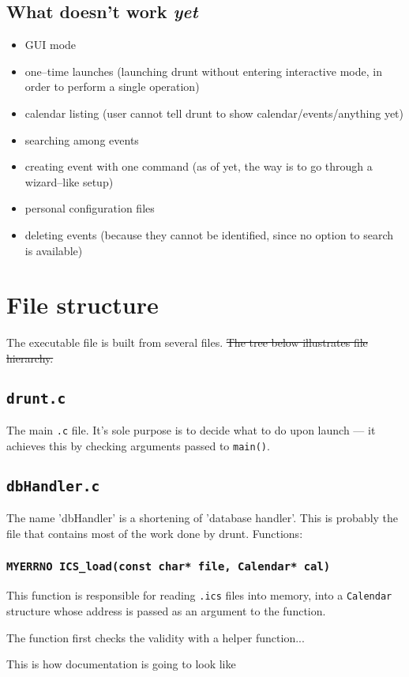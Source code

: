 \documentclass[a4paper]{article}
\begin{document}
\subsection{What doesn't work \textit{yet}}
\begin{itemize}
	\item GUI mode
	\item one--time launches (launching drunt without entering interactive mode, in order to perform a single operation)
	\item calendar listing (user cannot tell drunt to show calendar/events/anything yet)
	\item searching among events
	\item creating event with one command (as of yet, the way is to go through a wizard--like setup)
	\item personal configuration files
	\item deleting events (because they cannot be identified, since no option to search is available)
\end{itemize}

\pagebreak

\section{File structure}

The executable file is built from several files. \sout{The tree below illustrates file hierarchy.}

\subsection{\texttt{drunt.c}}

The main \texttt{.c} file. It's sole purpose is to decide what to do upon launch --- it achieves this by checking arguments passed to \texttt{main()}.

\subsection{\texttt{dbHandler.c}}

The name 'dbHandler' is a shortening of 'database handler'. This is probably the file that contains most of the work done by drunt. Functions:

\subsubsection{\texttt{MYERRNO ICS\_load(const char* file, Calendar* cal)}}

This function is responsible for reading \texttt{.ics} files into memory, into a \texttt{Calendar} structure whose address is passed as an argument to the function.

The function first checks the validity with a helper function...

{ \centering \Huge This is how documentation is going to look like }
\end{document}
